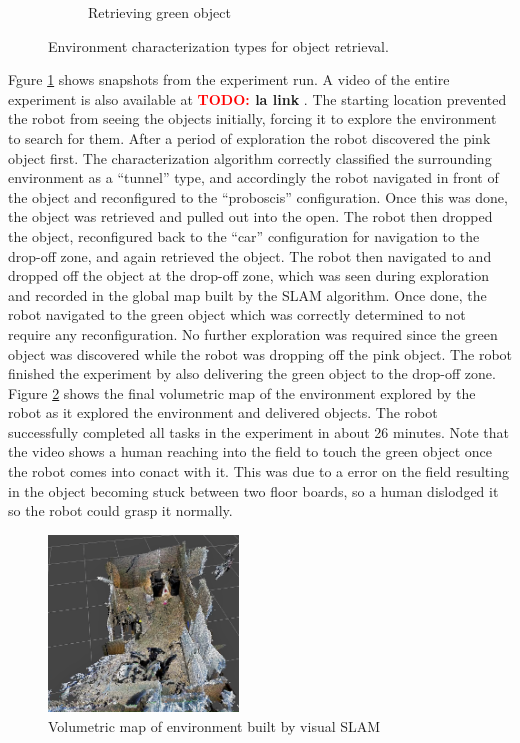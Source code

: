\documentclass[conference]{IEEEtran}
\newcommand{\TODO}[1]{ {\bf \textcolor{red}{TODO:} #1 }}
\begin{document}
\begin{figure}[t]
\begin{subfigure}[t]{0.32\textwidth}
        \caption{Retrieving green object}
    \end{subfigure}
      \caption{Environment characterization types for object retrieval.}
      \label{fig:demo}
   \end{figure}

Fgure \ref{fig:demo} shows snapshots from the experiment run. A video of the entire experiment is also available at \TODO{la link}. The starting location prevented the robot from seeing the objects initially, forcing it to explore the environment to search for them. After a period of exploration the robot discovered the pink object first. The characterization algorithm correctly classified the surrounding environment as a ``tunnel'' type, and accordingly the robot navigated in front of the object and reconfigured to the ``proboscis'' configuration. Once this was done, the object was retrieved and pulled out into the open. The robot then dropped the object, reconfigured back to the ``car'' configuration for navigation to the drop-off zone, and again retrieved the object. The robot then navigated to and dropped off the object at the drop-off zone, which was seen during exploration and recorded in the global map built by the SLAM algorithm. Once done, the robot navigated to the green object which was correctly determined to not require any reconfiguration. No further exploration was required since the green object was discovered while the robot was dropping off the pink object. The robot finished the experiment by also delivering the green object to the drop-off zone. Figure \ref{fig:octomap} shows the final volumetric map of the environment explored by the robot as it explored the environment and delivered objects. The robot successfully completed all tasks in the experiment in about 26 minutes. Note that the video shows a human reaching into the field to touch the green object once the robot comes into conact with it. This was due to a error on the field resulting in the object becoming stuck between two floor boards, so a human dislodged it so the robot could grasp it normally.

\begin{figure}
\begin{center}
\includegraphics[width=0.45\textwidth]{images/octomap.png}
\caption{Volumetric map of environment built by visual SLAM}
\label{fig:octomap}
\end{center}
\end{figure}
\end{document}
